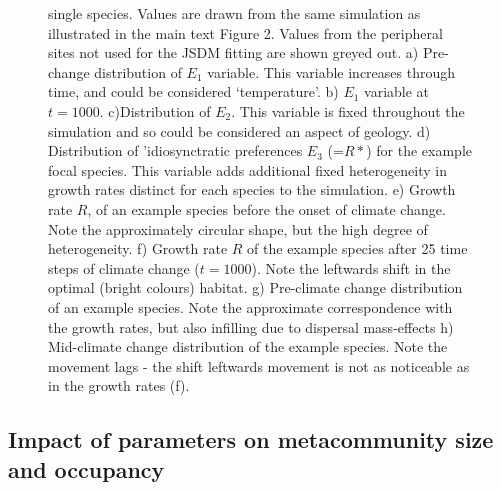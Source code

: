\documentclass[
]{article}
\begin{document}
\begin{figure}
{single species. Values are drawn from the same simulation as illustrated
in the main text Figure 2. Values from the peripheral sites not used for
the JSDM fitting are shown greyed out. a) Pre-change distribution of
\(E_1\) variable. This variable increases through time, and could be
considered `temperature'. b) \(E_1\) variable at \(t=1000\).
c)Distribution of \(E_2\). This variable is fixed throughout the
simulation and so could be considered an aspect of geology. d)
Distribution of 'idiosynctratic preferences \(E_3\) (=\(R*\)) for the
example focal species. This variable adds additional fixed heterogeneity
in growth rates distinct for each species to the simulation. e) Growth
rate \(R\), of an example species before the onset of climate change.
Note the approximately circular shape, but the high degree of
heterogeneity. f) Growth rate \(R\) of the example species after 25 time
steps of climate change (\(t=1000\)). Note the leftwards shift in the
optimal (bright colours) habitat. g) Pre-climate change distribution of
an example species. Note the approximate correspondence with the growth
rates, but also infilling due to dispersal mass-effects h) Mid-climate
change distribution of the example species. Note the movement lags - the
shift leftwards movement is not as noticeable as in the growth rates
(f).}
\end{figure}

\hypertarget{impact-of-parameters-on-metacommunity-size-and-occupancy}{%
\subsection{Impact of parameters on metacommunity size and
occupancy}\label{impact-of-parameters-on-metacommunity-size-and-occupancy}}
\end{document}
